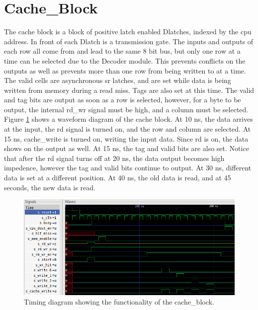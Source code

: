 \documentclass[10pt]{article}
\begin{document}
\section{Cache_Block}
The cache block is a block of positive latch enabled Dlatches, indexed by the
cpu address. In front of each Dlatch is a transmission gate. The inputs and
outputs of each row all come from and lead to the same 8 bit bus, but only one row at a time can
be selected due to the Decoder module. This prevents conflicts on the outputs as
well as prevents more than one row from being written to at a time. The valid
cells are asynchronous sr latches, and are set while data is being written from
memory during a read miss. Tags are also set at this time. The valid and tag
bits are output as soon as a row is selected, however, for a byte to be
output, the internal rd_wr signal must be high, and a column must be selected.
Figure \ref{cb} shows a waveform diagram of the cache block. At 10 ns, the data
arrives at the input, the rd signal is turned on, and the row and column are
selected. At 15 ns, cache_write is turned on, writing the input data. Since rd
is on, the data shows on the output as well. At 15 ns, the tag and valid bits
are also set. Notice that after the rd signal turns off at 20 ns, the data
output becomes high impedence, however the tag and valid bits continue to
output. At 30 ns, different data is set at a different position. At 40 ns, the
old data is read, and at 45 seconds, the new data is read.

\begin{figure}
    \centering
    \includegraphics[width=\textwidth]{cb.png}
    \caption{Timing diagram showing the functionality of the cache_block.}
    \label{cb}
\end{figure}
\end{document}
